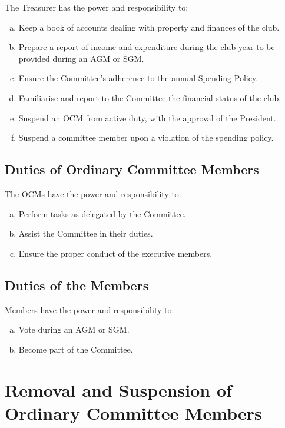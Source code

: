 \documentclass[a4paper,12pt]{article}
\begin{document}
The Treasurer has the power and responsibility to:

\begin{enumerate}[a)]
	\item Keep a book of accounts dealing with property and finances of the club.
	\item Prepare a report of income and expenditure during the club year to be provided during an AGM or SGM.
	\item Ensure the Committee's adherence to the annual Spending Policy.
	\item Familiarise and report to the Committee the financial status of the club.
	\item Suspend an OCM from active duty, with the approval of the President.
	\item Suspend a committee member upon a violation of the spending policy.
\end{enumerate}

\subsection{Duties of Ordinary Committee Members}

The OCMs have the power and responsibility to:

\begin{enumerate}[a)]
	\item Perform tasks as delegated by the Committee.
	\item Assist the Committee in their duties.
	\item Ensure the proper conduct of the executive members.
\end{enumerate}

\subsection{Duties of the Members}

Members have the power and responsibility to:

\begin{enumerate}[a)]
	\item Vote during an AGM or SGM.
	\item Become part of the Committee.
\end{enumerate}

\section{Removal and Suspension of Ordinary Committee Members}
\end{document}
